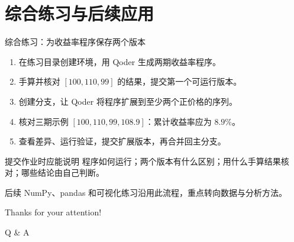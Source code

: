 \documentclass[9pt]{ctexbeamer}
\begin{document}
\section{综合练习与后续应用}

\begin{frame}{综合练习：为收益率程序保存两个版本}
  \begin{enumerate}
    \item 在练习目录创建环境，用 Qoder 生成两期收益率程序。
    \item 手算并核对 $[100,110,99]$ 的结果，提交第一个可运行版本。
    \item 创建分支，让 Qoder 将程序扩展到至少两个正价格的序列。
    \item 核对三期示例 $[100,110,99,108.9]$：累计收益率应为 $8.9\%$。
    \item 查看差异、运行验证，提交扩展版本，再合并回主分支。
  \end{enumerate}
  \begin{block}{提交作业时应能说明}
    程序如何运行；两个版本有什么区别；用什么手算结果核对；哪些结论由自己判断。
  \end{block}
  {\small 后续 NumPy、pandas 和可视化练习沿用此流程，重点转向数据与分析方法。}
\end{frame}

\appendix



\begin{frame}
	\begin{center}
		{\Huge\calligra Thanks for your attention!}
		\vspace{1cm}

		{\Huge Q \& A}
	\end{center}
\end{frame}
\end{document}
